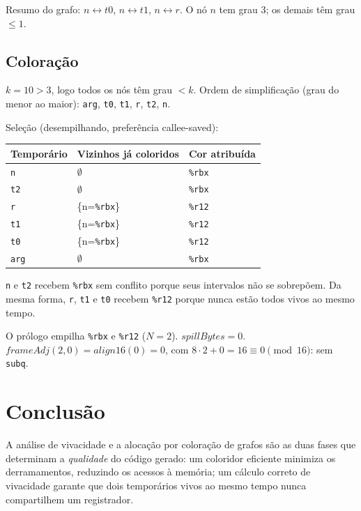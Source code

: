 \medskip
\noindent
Resumo do grafo:
$n \leftrightarrow t0$, $n \leftrightarrow t1$, $n \leftrightarrow r$.
O nó $n$ tem grau 3; os demais têm grau $\leq 1$.

\subsection{Coloração}

$k = 10 > 3$, logo todos os nós têm grau $< k$. Ordem de simplificação
(grau do menor ao maior): \texttt{arg}, \texttt{t0}, \texttt{t1},
\texttt{r}, \texttt{t2}, \texttt{n}.

Seleção (desempilhando, preferência callee-saved):

\begin{center}
  \begin{tabular}{lll}
    \toprule
    Temporário & Vizinhos já coloridos & Cor atribuída \\
    \midrule
    \texttt{n}   & $\emptyset$                    & \texttt{\%rbx} \\
    \texttt{t2}  & $\emptyset$                    & \texttt{\%rbx} \\
    \texttt{r}   & \{n=\texttt{\%rbx}\}           & \texttt{\%r12} \\
    \texttt{t1}  & \{n=\texttt{\%rbx}\}           & \texttt{\%r12} \\
    \texttt{t0}  & \{n=\texttt{\%rbx}\}           & \texttt{\%r12} \\
    \texttt{arg} & $\emptyset$                    & \texttt{\%rbx} \\
    \bottomrule
  \end{tabular}
\end{center}

\texttt{n} e \texttt{t2} recebem \texttt{\%rbx} sem conflito porque seus
intervalos não se sobrepõem. Da mesma forma, \texttt{r}, \texttt{t1} e
\texttt{t0} recebem \texttt{\%r12} porque nunca estão todos vivos ao mesmo
tempo.

O prólogo empilha \texttt{\%rbx} e \texttt{\%r12} ($N = 2$).
$\mathit{spillBytes} = 0$.
$\mathit{frameAdj}(2, 0) = \mathit{align16}(0) = 0$, com
$8 \cdot 2 + 0 = 16 \equiv 0 \pmod{16}$: sem \texttt{subq}.

\section{Conclusão}

A análise de vivacidade e a alocação por coloração de grafos são as duas
fases que determinam a \emph{qualidade} do código gerado: um coloridor
eficiente minimiza os derramamentos, reduzindo os acessos à memória; um
cálculo correto de vivacidade garante que dois temporários vivos ao mesmo
tempo nunca compartilhem um registrador.

